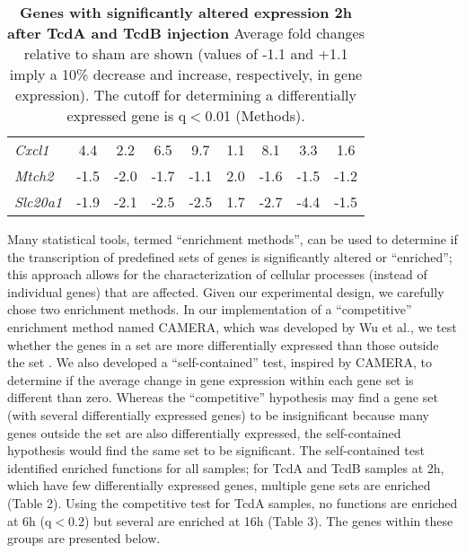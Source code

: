 \begin{table}[h!]
\begin{center}
\begin{tabular}{ l c c c | c c c | c c }
\textit{Cxcl1} & 4.4 & 2.2 & 6.5 & 9.7 & 1.1 & 8.1 & 3.3 & 1.6 \\
\textit{Mtch2} & -1.5 & -2.0 & -1.7 & -1.1 & 2.0 & -1.6 & -1.5 & -1.2 \\
\textit{Slc20a1} & -1.9 & -2.1 & -2.5 & -2.5 & 1.7 & -2.7 & -4.4 & -1.5 \\
\end{tabular}
\caption[Genes with significantly altered expression 2h after TcdA or TcdB injection]{
 \textbf{Genes with significantly altered expression 2h after TcdA and TcdB injection}
Average fold changes relative to sham are shown (values of -1.1 and +1.1 imply a 10\% decrease and increase, respectively, in gene expression). The cutoff for determining a differentially expressed gene is q$<$0.01 (Methods). }
\label{ini:table1}
\end{center}
\end{table}


Many statistical tools, termed ``enrichment methods'', can be used to determine if the transcription of predefined sets of genes is significantly altered or ``enriched''; this approach allows for the characterization of cellular processes (instead of individual genes) that are affected. Given our experimental design, we carefully chose two enrichment methods. In our implementation of a “competitive” enrichment method named CAMERA, which was developed by Wu et al., we test whether the genes in a set are more differentially expressed than those outside the set \cite{Wu:2012kp}. We also developed a “self-contained” test, inspired by CAMERA, to determine if the average change in gene expression within each gene set is different than zero. Whereas the “competitive” hypothesis may find a gene set (with several differentially expressed genes) to be insignificant because many genes outside the set are also differentially expressed, the self-contained hypothesis would find the same set to be significant. The self-contained test identified enriched functions for all samples; for TcdA and TcdB samples at 2h, which have few differentially expressed genes, multiple gene sets are enriched (Table 2). Using the competitive test for TcdA samples, no functions are enriched at 6h (q$<$0.2) but several are enriched at 16h (Table 3). The genes within these groups are presented below.

